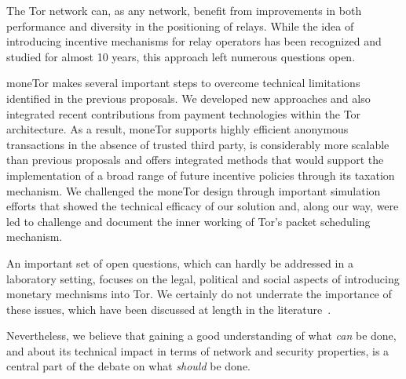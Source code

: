 
The Tor network can, as any network, benefit from improvements in both
performance and diversity in the positioning of relays. While the idea
of introducing incentive mechanisms for relay operators has been
recognized and studied for almost 10 years, this approach left
numerous questions open.

moneTor makes several important steps to overcome technical
limitations identified in the previous proposals. We developed new
approaches and also integrated recent contributions from payment
technologies within the Tor architecture. As a result, moneTor
supports highly efficient anonymous transactions in the absence of
trusted third party, is considerably more scalable than previous
proposals and offers integrated methods that would support the
implementation of a broad range of future incentive policies through
its taxation mechanism. We challenged the moneTor design through important
simulation efforts that showed the technical efficacy of our solution
and, along our way, were led to challenge and document the inner
working of Tor's packet scheduling mechanism.

An important set of open questions, which can hardly be addressed in a
laboratory setting, focuses on the legal, political and social aspects
of introducing monetary mechnisms into Tor. We certainly do not
underrate the importance of these issues, which have been discussed at
length in the literature~\cite{jansenblogpost}.

Nevertheless, we believe that gaining a good understanding of what
\emph{can} be done, and about its technical impact in terms of network
and security properties, is a central part of the debate on what
\emph{should} be done.




